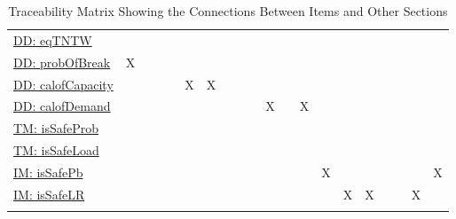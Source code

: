 \documentclass[12pt]{article}
\begin{document}
\begin{longtable}{l l l l l l l l l l l l l l l l l l l l}
\\
\hyperref[DD:eqTNTW]{DD: eqTNTW} &  &  &  &  &  &  &  &  &  &  &  &  &  &  &  &  &  &  & 
\\
\hyperref[DD:probOfBreak]{DD: probOfBreak} & X &  &  &  &  &  &  &  &  &  &  &  &  &  &  &  &  &  & 
\\
\hyperref[DD:calofCapacity]{DD: calofCapacity} &  &  &  &  & X & X &  &  &  &  &  &  &  &  &  &  &  &  & 
\\
\hyperref[DD:calofDemand]{DD: calofDemand} &  &  &  &  &  &  &  &  &  & X &  & X &  &  &  &  &  &  & 
\\
\hyperref[TM:isSafeProb]{TM: isSafeProb} &  &  &  &  &  &  &  &  &  &  &  &  &  &  &  &  &  &  & 
\\
\hyperref[TM:isSafeLoad]{TM: isSafeLoad} &  &  &  &  &  &  &  &  &  &  &  &  &  &  &  &  &  &  & 
\\
\hyperref[IM:isSafePb]{IM: isSafePb} &  &  &  &  &  &  &  &  &  &  &  &  & X &  &  &  &  &  & X
\\
\hyperref[IM:isSafeLR]{IM: isSafeLR} &  &  &  &  &  &  &  &  &  &  &  &  &  & X & X &  &  & X & 
\\
\bottomrule
\caption{Traceability Matrix Showing the Connections Between Items and Other Sections}
\label{Table:TraceMatRefvsRef}
\end{longtable}
\end{document}
